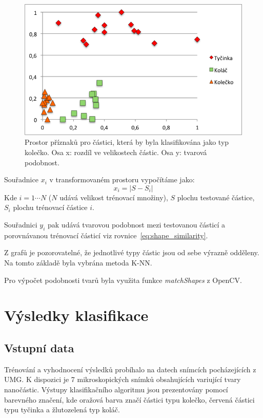 \documentclass[11pt,twoside,a4paper,table]{book}
\begin{document}
\begin{figure}[H]
	\centering
	\includegraphics[height=0.3\textheight]{figures/feature_space_kolecko.png}
	\caption{Prostor příznaků pro částici, která by byla klasifikována jako typ kolečko. Osa x: rozdíl ve velikostech částic. Osa y: tvarová podobnost.}
	\label{fig:feature_space_kolecko}
\end{figure}


Souřadnice $x_i$ v transformovaném prostoru vypočítáme jako:
\begin{equation}
x_i = \vert S - S_i \vert
\end{equation}
Kde $i=1 \cdots N$ ($N$ udává velikost trénovací množiny), $S$ plochu testované částice, $S_i$ plochu trénovací částice $i$.

Souřadnici $y_i$ pak udává tvarovou podobnost mezi testovanou částicí a porovnávanou trénovací částicí viz rovnice~\ref{eq:shape_similarity}.

Z grafů je pozorovatelné, že jednotlivé typy částic jsou od sebe výrazně odděleny. Na tomto základě byla vybrána metoda K-NN.

Pro výpočet podobnosti tvarů byla využita funkce \textit{matchShapes} z OpenCV\cite{opencv_library}.

\FloatBarrier
\section{Výsledky klasifikace}

\subsection{Vstupní data}
Trénování a vyhodnocení výsledků probíhalo na datech snímcích pocházejících z UMG. K dispozici je 7 mikroskopických snímků obsahujících variující tvary nanočástic. Výstupy klasifikačního algoritmu jsou prezentovány pomocí barevného značení, kde oražová barva značí částici typu kolečko, červená částici typu tyčinka a žlutozelená typ koláč. 
\end{document}
